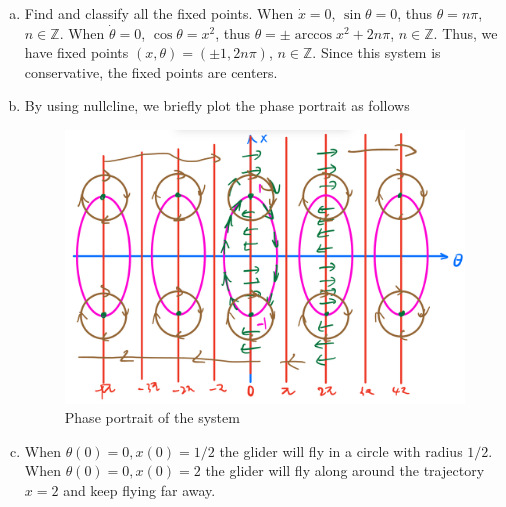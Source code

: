 \documentclass[12pt]{exam}
\begin{document}
\begin{enumerate}[(a)]
		\item Find and classify all the fixed points.
			When $\dot{x} =0$, $\sin \theta =0$, thus $\theta = n\pi$, $n\in \mathbb{Z}$. When $\dot{\theta}=0$, $\cos \theta = x^2$, thus $\theta = \pm \arccos x^2 + 2n\pi$, $n\in \mathbb{Z}$. Thus, we have fixed points $(x, \theta) = (\pm 1, 2n\pi)$, $n\in \mathbb{Z}$. Since this system is conservative, the fixed points are centers.			
		\item By using nullcline, we briefly plot the phase portrait as follows
			\begin{figure}[H]
				\centering
				\includegraphics[width=1\linewidth]{1b.jpeg}
				\caption{Phase portrait of the system}
			\end{figure}
		
		\item When $\theta(0) =0, x(0) =1/2$ the glider will fly in a circle with radius $1/2$.\\
			When $\theta(0) =0, x(0) =2$ the glider will fly along around the trajectory $x=2$ and keep flying far away.
	\end{enumerate}
\end{document}
